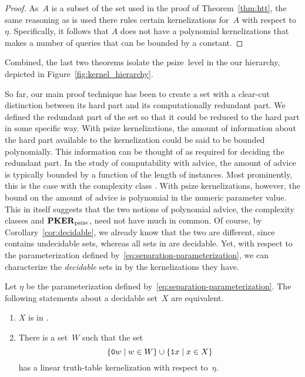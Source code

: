 \begin{proof}
  As~$A$ is a subset of the set used in the proof of Theorem~\ref{thm:htt}, the same reasoning as is used there rules certain kernelizations for~$A$ with respect to $\eta$.
  Specifically, it follows that $A$ does not have a polynomial kernelizations that makes a  number of queries that can be bounded by a constant.
\end{proof}

Combined, the last two theorems isolate the psize~level in the our hierarchy, depicted in Figure~\ref{fig:kernel_hierarchy}.

So far, our main proof technique has been to create a set with a clear-cut distinction between its hard part and its computationally redundant part.
We defined the redundant part of the set so that it could be reduced to the hard part in some specific way.
With psize kernelizations, the amount of information about the hard part available to the kernelization could be said to be bounded polynomially.
This information can be thought of as  required for deciding the redundant part.
In the study of computability with advice, the amount of advice is typically bounded by a function of the length of instances.
Most prominently, this is the case with the complexity class  \parencite{arora2009computational}.
With psize kernelizations, however, the bound on the amount of advice is polynomial in the numeric parameter value.
This in itself suggests that the two notions of polynomial advice, the complexity classes  and $\textnormal{\textbf{PKER}}_\textnormal{psize}$, need not have much in common.
Of course, by Corollary~\ref{cor:decidable}, we already know that the two are different, since  contains undecidable sets, whereas all sets in  are decidable.
Yet, with respect to the parameterization defined by~\eqref{eq:separation-parameterization}, we can characterize the \emph{decidable} sets in  by the kernelizations they have.
\begin{theorem}
\label{thm:ppoly-tt}%
  Let $\eta$ be the parameterization defined by~\eqref{eq:separation-parameterization}.
  The following statements about a decidable set~$X$ are equivalent.
  \begin{enumerate}
  \item\label{enum:advice:ppoly}
    $X$ is in .
  \item\label{enum:advice:psize}
    There is a set~$W$ such that the set
    \begin{equation*}
      \{\textnormal{\texttt{0}}w \;|\; w \in W\} \cup \{\textnormal{\texttt{1}}x \;|\; x \in X\}
    \end{equation*}
    has a linear truth-table kernelization with respect to~$\eta$.
  \end{enumerate}
\end{theorem}
